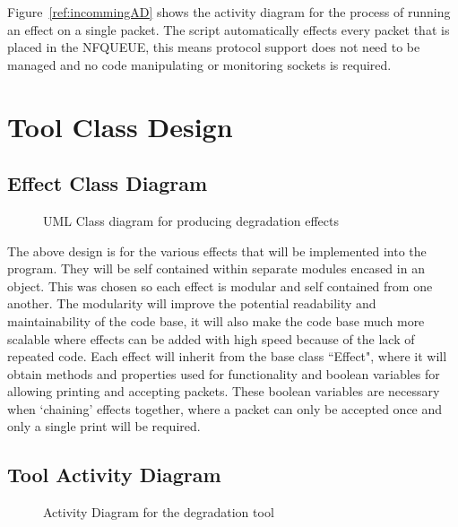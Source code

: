 Figure~\ref{ref:incommingAD} shows the activity diagram for the process of running an effect on a single packet. The script automatically effects every packet that is placed in the NFQUEUE, this means protocol support does not need to be managed and no code manipulating or monitoring sockets is required.

%
\section{Tool Class Design}
\subsection{Effect Class Diagram}

\begin{center}
	
	\begin{figure}[h]
		\caption{UML Class diagram for producing degradation effects}
	\end{figure}
\end{center}

The above design is for the various effects that will be implemented into the program. They will be self contained within separate modules encased in an object. This was chosen so each effect is modular and self contained from one another. The modularity will improve the potential readability and maintainability of the code base, it will also make the code base much more scalable where effects can be added with high speed because of the lack of repeated code.  Each effect will inherit from the base class ``Effect", where it will obtain methods and properties used for functionality and boolean variables for allowing printing and accepting packets. These boolean variables are necessary when `chaining' effects together, where a packet can only be accepted once and only a single print will be required.

\clearpage
\subsection{Tool Activity Diagram}
\begin{center}
	
	\begin{figure}[h]
		\caption{Activity Diagram for the degradation tool}
		\label{ref:ToolAD}
	\end{figure}
\end{center}

